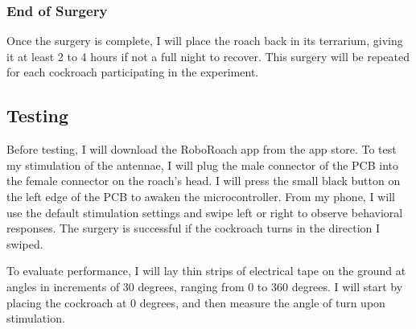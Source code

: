 \subsubsection{End of Surgery}

Once the surgery is complete, I will place the roach back in its terrarium, giving it at least 2 to 4 hours if not a full night to recover. This surgery will be repeated for each cockroach participating in the experiment.

\subsection{Testing}

Before testing, I will download the RoboRoach app from the app store. To test my stimulation of the antennae, I will plug the male connector of the PCB into the female connector on the roach's head. I will press the small black button on the
left edge of the PCB to awaken the microcontroller. From my phone, I will use the default stimulation settings and swipe left or right to observe behavioral responses. The surgery is successful if the cockroach turns in the direction I swiped.

\bigskip

To evaluate performance, I will lay thin strips of electrical tape on the ground at angles in increments of 30 degrees, ranging from 0 to 360 degrees. I will start by placing the cockroach at 0 degrees, and then measure the angle of turn upon stimulation. 






















